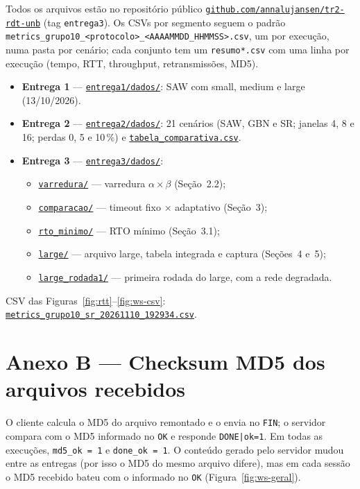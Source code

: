 \documentclass[11pt,a4paper]{article}
\newcommand{\repobase}{https://github.com/annalujansen/tr2-rdt-unb}
\newcommand{\reporef}{entrega3}
\newcommand{\repodir}[2]{\href{\repobase/tree/\reporef/#1}{#2}}
\newcommand{\repofile}[2]{\href{\repobase/blob/\reporef/#1}{#2}}
\newcommand{\cod}[1]{\textcolor{codverde}{\texttt{\small #1}}}
\begin{document}
Todos os arquivos estão no repositório público
\href{\repobase/tree/\reporef}{\cod{github.com/annalujansen/tr2-rdt-unb}} (tag \cod{entrega3}).
Os CSVs por segmento seguem o padrão
\cod{metrics\_grupo10\_\textless protocolo\textgreater\_\textless AAAAMMDD\_HHMMSS\textgreater.csv},
um por execução, numa pasta por cenário; cada conjunto tem um \cod{resumo*.csv} com uma linha por
execução (tempo, RTT, throughput, retransmissões, MD5).
\begin{itemize}
  \item \textbf{Entrega 1} --- \repodir{entregas/entrega1/dados}{\cod{entrega1/dados/}}: SAW com small,
        medium e large (13/10/2026).
  \item \textbf{Entrega 2} --- \repodir{entregas/entrega2/dados}{\cod{entrega2/dados/}}: 21 cenários
        (SAW, GBN e SR; janelas 4, 8 e 16; perdas 0, 5 e 10\,\%) e
        \repofile{entregas/entrega2/dados/tabela_comparativa.csv}{\cod{tabela\_comparativa.csv}}.
  \item \textbf{Entrega 3} --- \repodir{entregas/entrega3/dados}{\cod{entrega3/dados/}}:
  \begin{itemize}
    \item \repodir{entregas/entrega3/dados/varredura}{\cod{varredura/}} --- varredura $\alpha \times \beta$ (Seção~2.2);
    \item \repodir{entregas/entrega3/dados/comparacao}{\cod{comparacao/}} --- timeout fixo $\times$ adaptativo (Seção~3);
    \item \repodir{entregas/entrega3/dados/rto_minimo}{\cod{rto\_minimo/}} --- RTO mínimo (Seção~3.1);
    \item \repodir{entregas/entrega3/dados/large}{\cod{large/}} --- arquivo large, tabela integrada e captura (Seções~4 e~5);
    \item \repodir{entregas/entrega3/dados/large_rodada1}{\cod{large\_rodada1/}} --- primeira rodada do large, com a rede degradada.
  \end{itemize}
\end{itemize}
CSV das Figuras~\ref{fig:rtt}--\ref{fig:ws-csv}:
\repofile{entregas/entrega3/dados/large/large_sr_w16_loss0_adapt_a0.25_b0.125/metrics_grupo10_sr_20261110_192934.csv}{\cod{metrics\_grupo10\_sr\_20261110\_192934.csv}}.

\section*{Anexo B --- Checksum MD5 dos arquivos recebidos}

O cliente calcula o MD5 do arquivo remontado e o envia no \cod{FIN}; o servidor compara com o MD5
informado no \cod{OK} e responde \cod{DONE|ok=1}. Em todas as execuções, \cod{md5\_ok = 1} e
\cod{done\_ok = 1}. O conteúdo gerado pelo servidor mudou entre as entregas (por isso o MD5 do
mesmo arquivo difere), mas em cada sessão o MD5 recebido bateu com o informado no \cod{OK}
(Figura~\ref{fig:ws-geral}).
\end{document}
